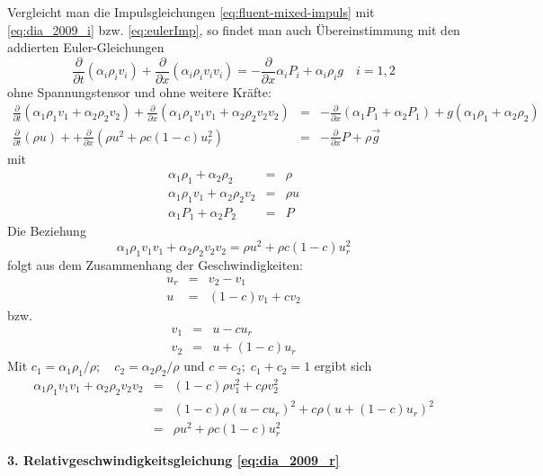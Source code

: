 Vergleicht man die Impulsgleichungen \ref{eq:fluent-mixed-impuls} mit
\ref{eq:dia_2009_i} bzw. \ref{eq:eulerImp}, so findet man auch
Übereinstimmung mit den addierten Euler-Gleichungen 
\[
\frac{\partial}{\partial t} (\alpha_i \rho_i v_i) + \frac{\partial}{\partial x} 
(\alpha_i\rho_i v_i v_i) = - \frac{\partial}{\partial x} \alpha_i P_i +
\alpha_i\rho_i g \quad i=1,2
\]
ohne Spannungstensor und ohne weitere Kräfte:
\begin{eqnarray*}
\frac{\partial}{\partial t} (\alpha_1 \rho_1 v_1 + \alpha_2 \rho_2 v_2) +
\frac{\partial}{\partial x} (\alpha_1 \rho_1 v_1 v_1 + \alpha_2 \rho_2 v_2 v_2) 
&=& 
- \frac{\partial}{\partial x} (\alpha_1 P_1 + \alpha_2 P_1)
+ g (\alpha_1\rho_1 + \alpha_2\rho_2)\\
\frac{\partial}{\partial t} (\rho u) + 
+
\frac{\partial}{\partial x} (\rho u^2 + \rho c (1-c) u_r^2) 
&=& 
- \frac{\partial}{\partial x} P + \rho \vec{g} 
\end{eqnarray*}
mit
\begin{eqnarray*}
\alpha_1\rho_1 + \alpha_2\rho_ 2  &=& \rho\\
\alpha_1\rho_1 v_1 + \alpha_2\rho_2 v_2 &=& \rho u\\
\alpha_1 P_1 + \alpha_2 P_ 2  &=& P
\end{eqnarray*}
Die Beziehung
\[
 \alpha_1\rho_1 v_1 v_1 + \alpha_2\rho_2 v_2 v_2 = \rho u^2 + \rho c (1-c) u_r^2 
\]
folgt aus dem Zusammenhang der Geschwindigkeiten:
\begin{eqnarray*}
u_{r} &=& v_{2}-v_{1}\\
u      &=& (1-c) v_{1} + c v_{2}
\end{eqnarray*}
bzw.
\begin{eqnarray}
v_{1} &=& u - c u_{r}\label{eq:v1}\\
v_{2} &=& u + (1-c) u_{r} \label{eq:v2}
\end{eqnarray}
Mit $c_{1} = \alpha_{1}\rho_1/\rho;\quad c_{2} =
\alpha_{2}\rho_2/\rho$ und $c = c_2; \; c_1+c_2 = 1$ ergibt sich
\begin{eqnarray*}
\alpha_1\rho_1 v_1 v_1 + \alpha_2\rho_2 v_2 v_2 &=& (1-c) \rho v_1^2 + c \rho v_2^2\\
&=& (1-c) \rho  (u - c u_{r})^2 + c \rho  (u + (1-c) u_{r})^2\\
 &=& \rho u^2 + \rho c (1-c) u_r^2 
\end{eqnarray*}

{\bf 3. Relativgeschwindigkeitsgleichung \ref{eq:dia_2009_r}}

